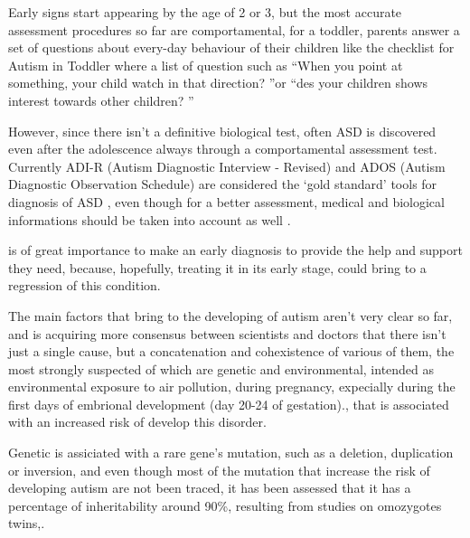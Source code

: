 \documentclass[12pt]{report}
\begin{document}

Early signs start appearing by the age of 2 or 3, but the most accurate assessment procedures so far are comportamental, for a toddler, parents answer a set of questions about every-day behaviour of their children like the checklist for Autism in Toddler \cite{robins-2009} where a list of question such as \textquotedblleft When you point at something, your child watch in that direction? \textquotedblright or \textquotedblleft des your children shows interest towards other children? \textquotedblright

However, since there isn't a definitive biological test, often ASD is discovered even after the adolescence always through a comportamental assessment test.
Currently ADI-R (Autism Diagnostic Interview - Revised) and ADOS (Autism Diagnostic Observation Schedule) are considered the ‘gold standard’ tools for diagnosis of ASD \cite{ozonoff-2015} \cite{lecouteur-2008}, even though for a better assessment, medical and biological informations should be taken into account as well .

is of great importance to make an early diagnosis to provide the help and support they need, because, hopefully, treating it in its early stage, could bring to a regression of this condition.

The main factors that bring to the developing of autism aren't very clear so far, and is acquiring more consensus between scientists and doctors that there isn't just a single cause, but a concatenation and cohexistence of various of them, the most strongly suspected of which are genetic and environmental, intended as environmental exposure to air pollution,
during pregnancy, expecially during the first days of embrional development (day 20-24 of gestation).\cite{ratajczak-2011}, that is associated with an increased risk of develop this disorder.

Genetic is assiciated with a rare gene's mutation, such as a deletion, duplication or inversion, and even though most of the mutation that increase the risk of developing autism are not been traced, it has been assessed that it has a percentage of inheritability around 90\%, resulting from studies on omozygotes twins,\cite{freitag-2007}.

\end{document}
